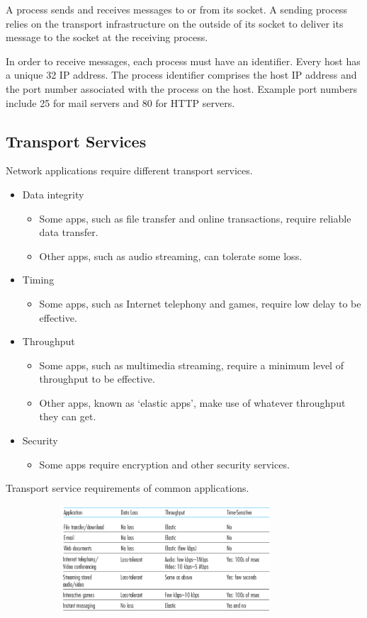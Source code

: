 A process sends and receives messages to or from its socket.
A sending process relies on the transport infrastructure on the outside of its socket to deliver its message to the socket at the receiving process.

In order to receive messages, each process must have an identifier.
Every host has a unique \SI{32}{\bit} IP address.
The process identifier comprises the host IP address and the port number associated with the process on the host.
Example port numbers include \num{25} for mail servers and \num{80} for HTTP servers.

\subsection{Transport Services}

Network applications require different transport services.
\begin{itemize}
  \item Data integrity
  \begin{itemize}
    \item Some apps, such as file transfer and online transactions, require reliable data transfer.
    \item Other apps, such as audio streaming, can tolerate some loss.
  \end{itemize}
  \item Timing
  \begin{itemize}
    \item Some apps, such as Internet telephony and games, require low delay to be effective.
  \end{itemize}
  \item Throughput
  \begin{itemize}
    \item Some apps, such as multimedia streaming, require a minimum level of throughput to be effective.
    \item Other apps, known as `elastic apps', make use of whatever throughput they can get.
  \end{itemize}
  \item Security
  \begin{itemize}
    \item Some apps require encryption and other security services.
  \end{itemize}
\end{itemize}

\begin{table}[htp]
  \centering
  \caption*{Transport service requirements of common applications.}
  \includegraphics[width=12cm,height=4cm]{unit-17/figures/transport-service-requirements.png}
\end{table}

